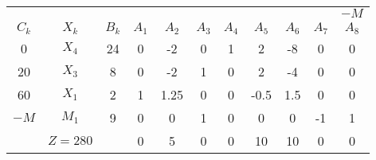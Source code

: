     \begin{tabular}{ccccccccccc}
    \hline
    \hline
            &         &         &         &         &         &         &         &         &         & $-M$ \bigstrut[t]\\
    $C_k$   & $X_k$   & $B_k$   & $A_1$   & $A_2$   & $A_3$   & $A_4$   & $A_5$   & $A_6$   & $A_7$   & $A_8$ \bigstrut[b]\\
    \hline
    0       & $X_4$   & 24      & 0       & -2      & 0       & 1       & 2       & -8      & 0       & 0 \bigstrut[t]\\
    20      & $X_3$   & 8       & 0       & -2      & 1       & 0       & 2       & -4      & 0       & 0 \\
    60      & $X_1$   & 2       & 1       & 1.25    & 0       & 0       & -0.5    & 1.5     & 0       & 0 \\
    $-M$    & $M_1$   & 9       & 0       & 0       & 1       & 0       & 0       & 0       & -1      & 1 \bigstrut[b]\\
    \hline
            & $Z=280$ &         & 0       & 5       & 0       & 0       & 10      & 10      & 0       & 0 \bigstrut\\
    \hline
    \hline
    \end{tabular}%

